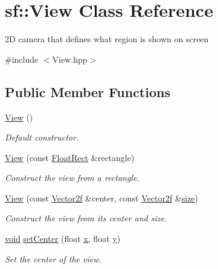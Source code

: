 \hypertarget{classsf_1_1_view}{\section{sf\-:\-:View Class Reference}
\label{classsf_1_1_view}
}


2\-D camera that defines what region is shown on screen  




{\ttfamily \#include $<$View.\-hpp$>$}

\subsection*{Public Member Functions}
\begin{DoxyCompactItemize}
\item 
\hyperlink{classsf_1_1_view_a28c38308ff089ae5bdacd001d12286d3}{View} ()
\begin{DoxyCompactList}\small\item\em Default constructor. \end{DoxyCompactList}\item 
\hyperlink{classsf_1_1_view_a1d63bc49e041b3b1ff992bb6430e1326}{View} (const \hyperlink{namespacesf_aed4e58f586b2eed2621c0365d0b7554e}{Float\-Rect} \&rectangle)
\begin{DoxyCompactList}\small\item\em Construct the view from a rectangle. \end{DoxyCompactList}\item 
\hyperlink{classsf_1_1_view_afdaf84cfc910ef160450d63603457ea4}{View} (const \hyperlink{namespacesf_acf03098c2577b869e2fa6836cc48f1a0}{Vector2f} \&center, const \hyperlink{namespacesf_acf03098c2577b869e2fa6836cc48f1a0}{Vector2f} \&\hyperlink{gl3_8h_a79ef9eb3e59c4bb34c4b9fbeb8d28ff7}{size})
\begin{DoxyCompactList}\small\item\em Construct the view from its center and size. \end{DoxyCompactList}\item 
\hyperlink{glutf90_8h_ac778d6f63f1aaf8ebda0ce6ac821b56e}{void} \hyperlink{classsf_1_1_view_aa8e3fedb008306ff9811163545fb75f2}{set\-Center} (float \hyperlink{gl3_8h_a92d0386e5c19fb81ea88c9f99644ab1d}{x}, float \hyperlink{gl3_8h_a66ddd433d2cacfe27f5906b7e86faeed}{y})
\begin{DoxyCompactList}\small\item\em Set the center of the view. \end{DoxyCompactList}\item 

\end{DoxyCompactItemize}
